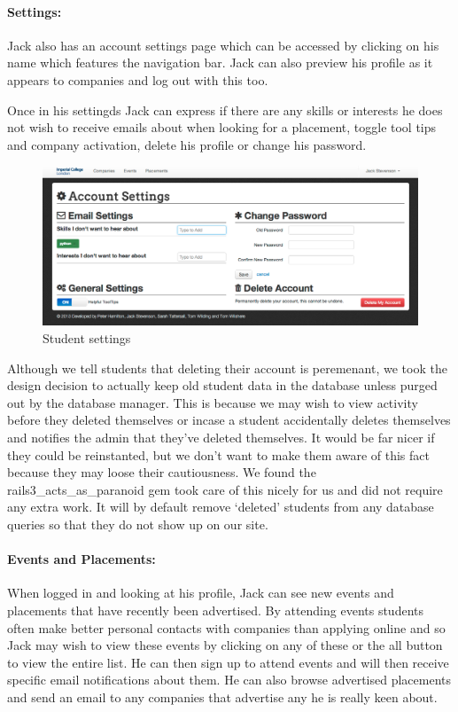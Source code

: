   \paragraph{Settings:}
    Jack also has an account settings page which can be accessed by clicking on his name which features the navigation bar. Jack can also preview his profile as it appears to companies and log out with this too. 

    Once in his settingds Jack can express if there are any skills or interests he does not wish to receive emails about when looking for a placement, toggle tool tips and company activation, delete his profile or change his password.

    \begin{figure}[H]\centering
    \includegraphics[scale=0.3]{images/user_experiences/student/account_settings}
    \caption{Student settings}
    \end{figure}

    Although we tell students that deleting their account is peremenant, we took the design decision to actually keep old student data in the database unless purged out by the database manager. This is because we may wish to view activity before they deleted themselves or incase a student accidentally deletes themselves and notifies the admin that they've deleted themselves. It would be far nicer if they could be reinstanted, but we don't want to make them aware of this fact because they may loose their cautiousness. We found the rails3\_acts\_as\_paranoid\cite{paranoid_gem} gem took care of this nicely for us and did not require any extra work. It will by default remove `deleted' students from any database queries so that they do not show up on our site.

  \paragraph{Events and Placements:}
    When logged in and looking at his profile, Jack can see new events and placements that have recently been advertised. By attending events students often make better personal contacts with companies than applying online and so Jack may wish to view these events by clicking on any of these or the all button to view the entire list. He can then sign up to attend events and will then receive specific email notifications about them.
    He can also browse advertised placements and send an email to any companies that advertise any he is really keen about.

